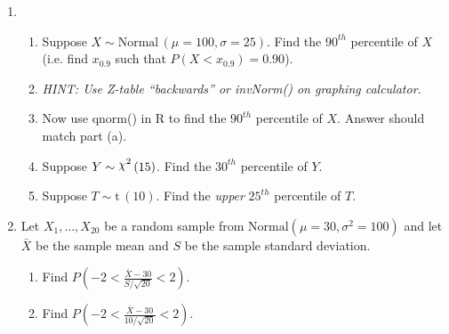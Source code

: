\documentclass{article}
\newcommand{\vecn}[2]{#1_1, \ldots, #1_{#2}}	%
\newcommand{\follow}[1]{\sim \text{#1}\,}		%
\newcommand{\chisq}{\raisebox{2pt}{$\chi^2$}}		%
\begin{document}
\begin{enumerate}
    \item 
    \begin{enumerate} %
        \item Suppose $X \follow{Normal}(\mu = 100, \sigma = 25)$. Find the $90^{th}$ percentile of $X$ (i.e. find $x_{0.9}$ such that $P(X < x_{0.9}) = 0.90$).
        \item[] \textit{HINT: Use Z-table ``backwards'' or invNorm() on graphing calculator.}\vspace{60pt}
        \item Now use qnorm() in R to find the $90^{th}$ percentile of $X$. Answer should match part (a).\vspace{60pt}
        \item Suppose $Y \follow{\chisq}(15)$. Find the $30^{th}$ percentile of $Y$.\vspace{60pt}
        \item Suppose $T \follow{t}(10)$. Find the \textit{upper} $25^{th}$ percentile of $T$.\vspace{60pt}
    \end{enumerate}\bigskip
    
    \item Let $\vecn{X}{20}$ be a random sample from $\text{Normal}(\mu = 30, \sigma^2 = 100)$ and let $\bar{X}$ be the sample mean and $S$ be the sample standard deviation.
    \begin{enumerate}
        \item Find $\displaystyle P(-2 < \frac{\bar{X} - 30}{S / \sqrt{20}} < 2)$.\vspace{60pt}
        \item Find $\displaystyle P(-2 < \frac{\bar{X} - 30}{10 / \sqrt{20}} < 2)$.\vspace{60pt}
    \end{enumerate}\bigskip

\end{enumerate}
\end{document}
